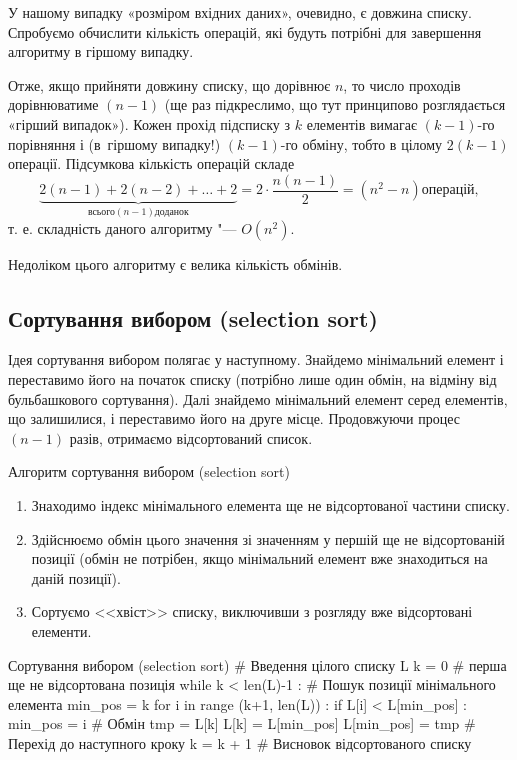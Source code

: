 У нашому випадку «розміром вхідних даних», очевидно, є довжина списку. Спробуємо обчислити кількість операцій, які будуть потрібні для завершення алгоритму в гіршому випадку.

Отже, якщо прийняти довжину списку, що дорівнює $ n $, то число проходів дорівнюватиме $(n -1)$ (ще раз підкреслимо, що тут принципово розглядається «гірший випадок»). Кожен прохід підсписку з $ k $ елементів вимагає $(k -1)$-го порівняння і (в~гіршому випадку!) $(k -1)$-го обміну, тобто в цілому $2(k -1)$ операції. Підсумкова кількість операцій складе
$$
\underbrace{2(n -1)+2(n -2)+\ldots +2}_{\text{всього}(n -1)\text{доданок}}=2\cdot \frac{n (n -1)}{2} = \left (n ^2- n \right) \text{операцій},
$$
т. е. складність даного алгоритму "--- $ O \left (n ^ 2 \right) $.

Недоліком цього алгоритму є велика кількість обмінів.

\subsection{Сортування вибором (selection sort)}\label{selection}

Ідея сортування вибором полягає у наступному. Знайдемо мінімальний елемент і переставимо його на початок списку (потрібно лише один обмін, на відміну від бульбашкового сортування). Далі знайдемо мінімальний елемент серед елементів, що залишилися, і переставимо його на друге місце. Продовжуючи процес $(n -1)$ разів, отримаємо відсортований список.

\begin{defn}{Алгоритм сортування вибором (selection sort)}
\begin{enumerate}
\item Знаходимо індекс мінімального елемента ще не відсортованої частини списку.
\item Здійснюємо обмін цього значення зі значенням у першій ще не відсортованій позиції (обмін не потрібен, якщо мінімальний елемент вже знаходиться на даній позиції).
\item 	Сортуємо <<хвіст>> списку, виключивши з розгляду вже відсортовані елементи.
\end{enumerate}
\end{defn}

\begin{py}{Сортування вибором (selection sort)}
# Введення цілого списку L
k = 0 # перша ще не відсортована позиція
while k < len(L)-1 :
    # Пошук позиції мінімального елемента
    min_pos = k
    for i in range (k+1, len(L)) :
        if L[i] < L[min_pos] :
            min_pos = i
    # Обмін
    tmp = L[k]
    L[k] = L[min_pos]
    L[min_pos] = tmp
    # Перехід до наступного кроку
    k = k + 1
# Висновок відсортованого списку
\end{py}

